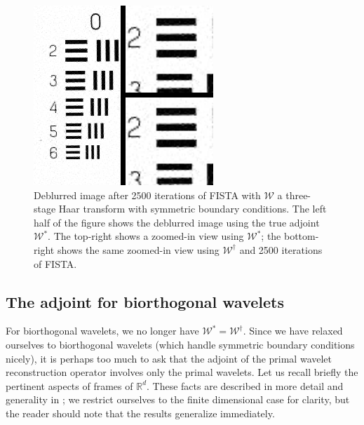 \documentclass[journal]{IEEEtran}
\newcommand{\reals}{\mathbb{R}}
\begin{document}
\begin{figure}
   \centering
   \includegraphics[width=0.8\columnwidth]{figures/compare_db1_sym_2500.png}
   \caption{Deblurred image after 2500 iterations of FISTA with $\mathcal{W}$ a three-stage Haar transform with symmetric boundary conditions.  The left half of the figure shows the deblurred image using the true adjoint $\mathcal{W}^\ast$.  The top-right shows a zoomed-in view using $\mathcal{W}^\ast$; the bottom-right shows the same zoomed-in view using $\mathcal{W}^\dagger$ and 2500 iterations of FISTA.}
   \label{fig:compare_db1_sym}
\end{figure}


\subsection{The adjoint for biorthogonal wavelets}
For biorthogonal wavelets, we no longer have $\mathcal{W}^\ast=\mathcal{W}^\dagger$.  Since we have relaxed ourselves to biorthogonal wavelets (which handle symmetric boundary conditions nicely), it is perhaps too much to ask that the adjoint of the primal wavelet reconstruction operator involves only the primal wavelets.  Let us recall briefly the pertinent aspects of frames of $\reals^d$.  These facts are described in more detail and generality in \cite{mallat_2009}; we restrict ourselves to the finite dimensional case for clarity, but the reader should note that the results generalize immediately.\\
\end{document}
